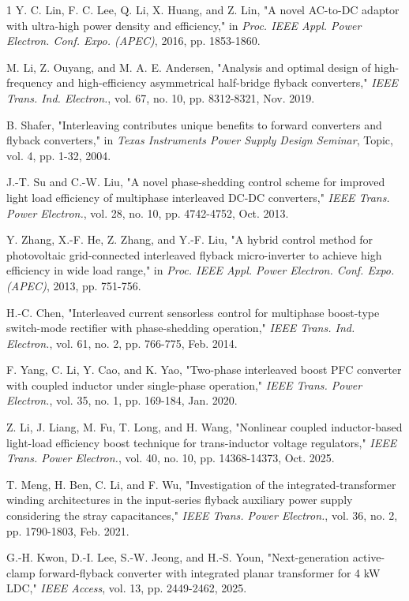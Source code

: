 \documentclass[lettersize,journal]{IEEEtran}
\begin{document}
\begin{thebibliography}{1}
Y. C. Lin, F. C. Lee, Q. Li, X. Huang, and Z. Lin, "A novel AC-to-DC adaptor with ultra-high power density and efficiency," in \textit{Proc. IEEE Appl. Power Electron. Conf. Expo. (APEC)}, 2016, pp. 1853-1860.

M. Li, Z. Ouyang, and M. A. E. Andersen, "Analysis and optimal design of high-frequency and high-efficiency asymmetrical half-bridge flyback converters," \textit{IEEE Trans. Ind. Electron.}, vol. 67, no. 10, pp. 8312-8321, Nov. 2019.

B. Shafer, "Interleaving contributes unique benefits to forward converters and flyback converters," in \textit{Texas Instruments Power Supply Design Seminar}, Topic, vol. 4, pp. 1-32, 2004.

J.-T. Su and C.-W. Liu, "A novel phase-shedding control scheme for improved light load efficiency of multiphase interleaved DC-DC converters," \textit{IEEE Trans. Power Electron.}, vol. 28, no. 10, pp. 4742-4752, Oct. 2013.

Y. Zhang, X.-F. He, Z. Zhang, and Y.-F. Liu, "A hybrid control method for photovoltaic grid-connected interleaved flyback micro-inverter to achieve high efficiency in wide load range," in \textit{Proc. IEEE Appl. Power Electron. Conf. Expo. (APEC)}, 2013, pp. 751-756.

H.-C. Chen, "Interleaved current sensorless control for multiphase boost-type switch-mode rectifier with phase-shedding operation," \textit{IEEE Trans. Ind. Electron.}, vol. 61, no. 2, pp. 766-775, Feb. 2014.

F. Yang, C. Li, Y. Cao, and K. Yao, "Two-phase interleaved boost PFC converter with coupled inductor under single-phase operation," \textit{IEEE Trans. Power Electron.}, vol. 35, no. 1, pp. 169-184, Jan. 2020.

Z. Li, J. Liang, M. Fu, T. Long, and H. Wang, "Nonlinear coupled inductor-based light-load efficiency boost technique for trans-inductor voltage regulators," \textit{IEEE Trans. Power Electron.}, vol. 40, no. 10, pp. 14368-14373, Oct. 2025.

T. Meng, H. Ben, C. Li, and F. Wu, "Investigation of the integrated-transformer winding architectures in the input-series flyback auxiliary power supply considering the stray capacitances," \textit{IEEE Trans. Power Electron.}, vol. 36, no. 2, pp. 1790-1803, Feb. 2021.

G.-H. Kwon, D.-I. Lee, S.-W. Jeong, and H.-S. Youn, "Next-generation active-clamp forward-flyback converter with integrated planar transformer for 4 kW LDC," \textit{IEEE Access}, vol. 13, pp. 2449-2462, 2025.


\end{thebibliography}
\end{document}
